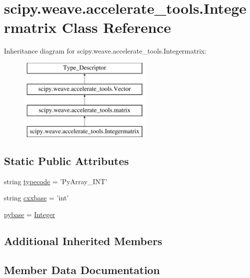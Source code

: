 \hypertarget{classscipy_1_1weave_1_1accelerate__tools_1_1Integermatrix}{}\section{scipy.\+weave.\+accelerate\+\_\+tools.\+Integermatrix Class Reference}
\label{classscipy_1_1weave_1_1accelerate__tools_1_1Integermatrix}
Inheritance diagram for scipy.\+weave.\+accelerate\+\_\+tools.\+Integermatrix\+:\begin{figure}[H]
\begin{center}
\leavevmode
\includegraphics[height=4.000000cm]{classscipy_1_1weave_1_1accelerate__tools_1_1Integermatrix}
\end{center}
\end{figure}
\subsection*{Static Public Attributes}
\begin{DoxyCompactItemize}
\item 
string \hyperlink{classscipy_1_1weave_1_1accelerate__tools_1_1Integermatrix_ad28c0c883369f0c681dbd392a3163069}{typecode} = 'Py\+Array\+\_\+\+I\+N\+T'
\item 
string \hyperlink{classscipy_1_1weave_1_1accelerate__tools_1_1Integermatrix_a8f944d1c9f181d47befcf39400b19428}{cxxbase} = 'int'
\item 
\hyperlink{classscipy_1_1weave_1_1accelerate__tools_1_1Integermatrix_a59d508b74495be2c8b3d72c655e1fa26}{pybase} = \hyperlink{classscipy_1_1weave_1_1accelerate__tools_1_1Integer}{Integer}
\end{DoxyCompactItemize}
\subsection*{Additional Inherited Members}


\subsection{Member Data Documentation}
\hypertarget{classscipy_1_1weave_1_1accelerate__tools_1_1Integermatrix_a8f944d1c9f181d47befcf39400b19428}{}

